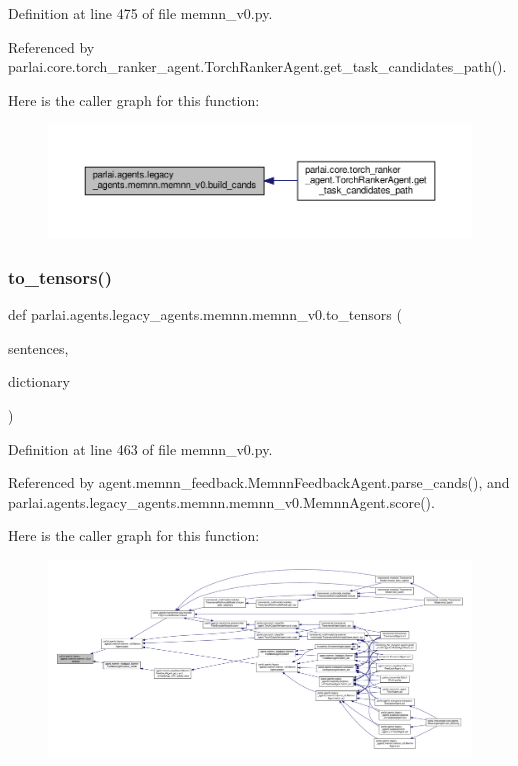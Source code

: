 Definition at line 475 of file memnn\+\_\+v0.\+py.



Referenced by parlai.\+core.\+torch\+\_\+ranker\+\_\+agent.\+Torch\+Ranker\+Agent.\+get\+\_\+task\+\_\+candidates\+\_\+path().

Here is the caller graph for this function\+:
\nopagebreak
\begin{figure}[H]
\begin{center}
\leavevmode
\includegraphics[width=350pt]{namespaceparlai_1_1agents_1_1legacy__agents_1_1memnn_1_1memnn__v0_ab07fdb540c02e8e2a1cc7e8cf662a8b8_icgraph}
\end{center}
\end{figure}
\mbox{\label{namespaceparlai_1_1agents_1_1legacy__agents_1_1memnn_1_1memnn__v0_a8bf19c6993b40602c1d86a848b30c5a1}} 
\subsubsection{\texorpdfstring{to\+\_\+tensors()}{to\_tensors()}}
{\footnotesize\ttfamily def parlai.\+agents.\+legacy\+\_\+agents.\+memnn.\+memnn\+\_\+v0.\+to\+\_\+tensors (\begin{DoxyParamCaption}\item[{}]{sentences,  }\item[{}]{dictionary }\end{DoxyParamCaption})}



Definition at line 463 of file memnn\+\_\+v0.\+py.



Referenced by agent.\+memnn\+\_\+feedback.\+Memnn\+Feedback\+Agent.\+parse\+\_\+cands(), and parlai.\+agents.\+legacy\+\_\+agents.\+memnn.\+memnn\+\_\+v0.\+Memnn\+Agent.\+score().

Here is the caller graph for this function\+:
\nopagebreak
\begin{figure}[H]
\begin{center}
\leavevmode
\includegraphics[width=350pt]{namespaceparlai_1_1agents_1_1legacy__agents_1_1memnn_1_1memnn__v0_a8bf19c6993b40602c1d86a848b30c5a1_icgraph}
\end{center}
\end{figure}
